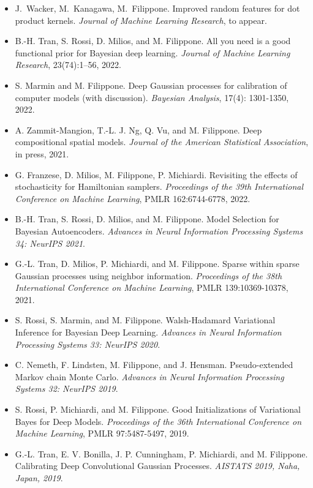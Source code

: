 \documentclass[oneside, a4paper, onecolumn, 10pt]{article}
\begin{document}
\linespread{0.9}
\selectfont

\begin{itemize}
  \setlength\itemsep{4pt}
\item  J.~Wacker, M.~Kanagawa, M.~Filippone. Improved random features for dot product kernels. \emph{Journal of Machine Learning Research}, to appear.
\item  B.-H. Tran, S. Rossi, D. Milios, and M. Filippone. All you need is a good functional prior for Bayesian deep learning. \emph{Journal of Machine Learning Research}, 23(74):1--56, 2022.
\item  S. Marmin and M. Filippone. Deep Gaussian processes for calibration of computer models (with discussion). \emph{Bayesian Analysis}, 17(4): 1301-1350, 2022.
\item  A. Zammit-Mangion, T.-L. J. Ng, Q. Vu, and M. Filippone. Deep compositional spatial models. \emph{Journal of the American Statistical Association}, in press, 2021.
\item  G. Franzese, D. Milios, M. Filippone, P. Michiardi. Revisiting the effects of stochasticity for Hamiltonian samplers. \emph{Proceedings of the 39th International Conference on Machine Learning}, PMLR 162:6744-6778, 2022.
\item  B.-H. Tran, S. Rossi, D. Milios, and M. Filippone. Model Selection for Bayesian Autoencoders. \emph{Advances in Neural Information Processing Systems 34: NeurIPS 2021}.  
\item  G.-L. Tran, D. Milios, P. Michiardi, and M. Filippone. Sparse within sparse Gaussian processes using neighbor information. \emph{Proceedings of the 38th International Conference on Machine Learning}, PMLR 139:10369-10378, 2021.
\item  S. Rossi, S. Marmin, and M. Filippone. Walsh-Hadamard Variational Inference for Bayesian Deep Learning. \emph{Advances in Neural Information Processing Systems 33: NeurIPS 2020}.  
\item  C. Nemeth, F. Lindsten, M. Filippone, and J. Hensman. Pseudo-extended Markov chain Monte Carlo. \emph{Advances in Neural Information Processing Systems 32: NeurIPS 2019}. %
\item  S. Rossi, P. Michiardi, and M. Filippone. Good Initializations of Variational Bayes for Deep Models. \emph{Proceedings of the 36th International Conference on Machine Learning}, PMLR 97:5487-5497, 2019.  
\item  G.-L. Tran, E. V. Bonilla, J. P. Cunningham, P. Michiardi, and M. Filippone. Calibrating Deep Convolutional Gaussian Processes. \emph{AISTATS 2019, Naha, Japan, 2019}.  

\end{itemize}
\end{document}
